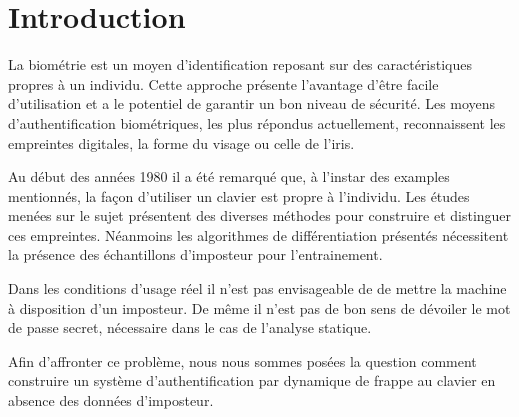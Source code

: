 \section{Introduction}

La biométrie est un moyen d’identification reposant sur des caractéristiques propres à un individu. Cette approche présente l'avantage d'être facile d'utilisation et a le potentiel de garantir un bon niveau de sécurité. Les moyens d'authentification biométriques, les plus répondus actuellement, reconnaissent les empreintes digitales, la forme du visage ou celle de l’iris.

Au début des années 1980 il a été remarqué que, à l’instar des examples mentionnés, la façon d’utiliser un clavier est propre à l’individu. Les études menées sur le sujet présentent des diverses méthodes pour construire et distinguer ces empreintes. Néanmoins les algorithmes de différentiation présentés nécessitent la présence des échantillons d’imposteur pour l'entrainement. 

Dans les conditions d'usage réel il n'est pas envisageable de de mettre la machine à disposition d'un imposteur. De même il n'est pas de bon sens de dévoiler le mot de passe secret, nécessaire dans le cas de l'analyse statique.

Afin d’affronter ce problème, nous nous sommes posées la question comment construire un système d'authentification par dynamique de frappe au clavier en absence des données d’imposteur.



